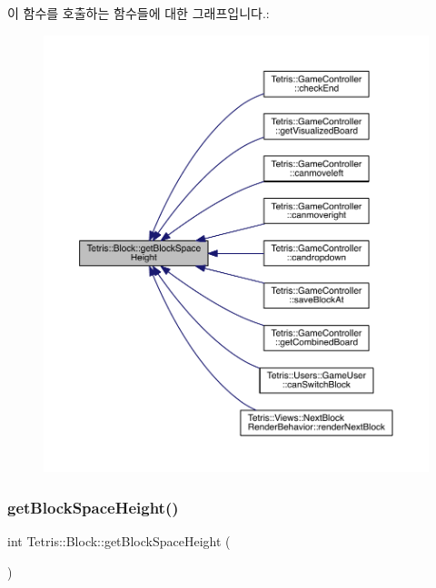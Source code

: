 이 함수를 호출하는 함수들에 대한 그래프입니다.\+:
\nopagebreak
\begin{figure}[H]
\begin{center}
\leavevmode
\includegraphics[width=350pt]{class_tetris_1_1_block_a5301977e32c03aaf122fa289fcba77ba_icgraph}
\end{center}
\end{figure}
\mbox{\label{class_tetris_1_1_block_a5301977e32c03aaf122fa289fcba77ba}} 
\subsubsection{\texorpdfstring{get\+Block\+Space\+Height()}{getBlockSpaceHeight()}\hspace{0.1cm}{\footnotesize\ttfamily [2/2]}}
{\footnotesize\ttfamily int Tetris\+::\+Block\+::get\+Block\+Space\+Height (\begin{DoxyParamCaption}{ }\end{DoxyParamCaption})\hspace{0.3cm}{\ttfamily [inline]}}

